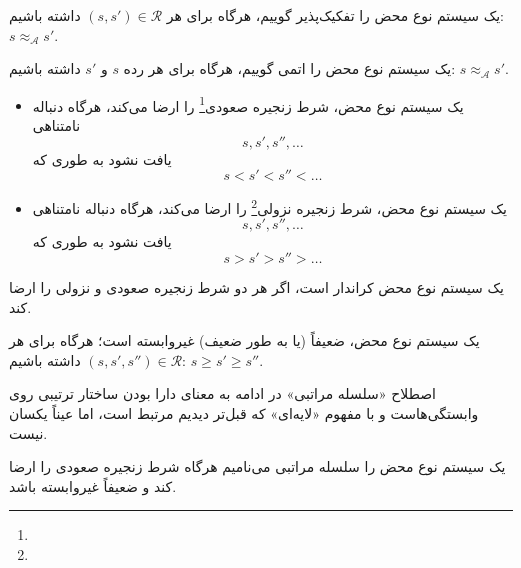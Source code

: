 \begin{defn}
یک سیستم نوع محض را تفکیک‌پذیر گوییم، هرگاه برای هر
$(s,s') \in \mathcal{R}$
داشته باشیم:
$s \approx_\mathcal{A} s'$.
\end{defn}

\begin{defn}
یک سیستم نوع محض را اتمی گوییم، هرگاه برای هر رده
$s$ و $s'$
داشته باشیم:
$s \approx_\mathcal{A} s'$.
\end{defn}

\begin{defn}
\hfill
\begin{itemize}
\item یک سیستم نوع محض، شرط زنجیره صعودی\footnote{} را ارضا می‌کند، هرگاه دنباله نامتناهی
\begin{equation*}
s,s',s'',\dots
\end{equation*}
یافت نشود به طوری که
\begin{equation*}
s < s' < s'' < \dots
\end{equation*}
\item یک سیستم نوع محض، شرط زنجیره نزولی\footnote{} را ارضا می‌کند، هرگاه دنباله نامتناهی
\begin{equation*}
s,s',s'',\dots
\end{equation*}
یافت نشود به طوری که
\begin{equation*}
s > s' > s'' > \dots
\end{equation*}
\end{itemize}
یک سیستم نوع محض کراندار است، اگر هر دو شرط زنجیره صعودی و نزولی را ارضا کند.
\end{defn}

\begin{defn}\label{non-dependent}
یک سیستم نوع محض، ضعیفاً (یا به طور ضعیف) غیروابسته است؛ هرگاه برای هر
$(s,s',s'') \in \mathcal{R}$
داشته باشیم:
$s \ge s' \ge s''$.
\end{defn}

اصطلاح «سلسله مراتبی» در ادامه به معنای دارا بودن ساختار ترتیبی روی وابستگی‌هاست و با مفهوم «لایه‌ای» که قبل‌تر دیدیم مرتبط است، اما عیناً یکسان نیست.

\begin{defn}
یک سیستم نوع محض را سلسله مراتبی می‌نامیم هرگاه شرط زنجیره صعودی را ارضا کند و ضعیفاً غیروابسته باشد.
\end{defn}

